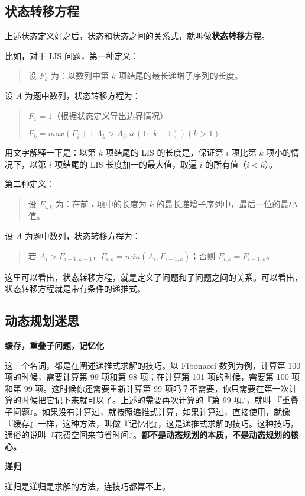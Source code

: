 \subsection{状态转移方程}

上述状态定义好之后，状态和状态之间的关系式，就叫做\textbf{状态转移方程}。

比如，对于 LIS 问题，第一种定义：
\begin{quotation}
设 $F_{k}$ 为：以数列中第 $k$ 项结尾的最长递增子序列的长度。
\end{quotation}
设 $A$ 为题中数列，状态转移方程为：
\begin{quotation}
$F_{1} = 1$（根据状态定义导出边界情况）

$F_{k} = max(F_{i} + 1 | A_{k} > A_{i}, i \epsilon (1\cdots k-1)) (k > 1)$
\end{quotation}
用文字解释一下是：以第 $k$ 项结尾的 LIS 的长度是，保证第 $i$ 项比第 $k$ 项小的情况下，以第 $i$ 项结尾的 LIS 长度加一的最大值，取遍 $i$
的所有值（$i < k$）。

第二种定义：
\begin{quotation}
设 $F_{i, k}$ 为：在前 $i$ 项中的长度为 $k$ 的最长递增子序列中，最后一位的最小值。
\end{quotation}
设 $A$ 为题中数列，状态转移方程为：
\begin{quotation}
若 $A_{i} > F_{i-1, k-1}$，$F_{i, k} = min(A_{i}, F_{i-1, k})$；否则 $F_{i, k} = F_{i-1, k}$。
\end{quotation}
这里可以看出，状态转移方程，就是定义了问题和子问题之间的关系。可以看出，状态转移方程就是带有条件的递推式。

\subsection{动态规划迷思}

\noindent\textbf{缓存，重叠子问题，记忆化}

这三个名词，都是在阐述递推式求解的技巧。以 Fibonacci 数列为例，计算第 100 项的时候，需要计算第 99 项和第 98 项；在计算第 101 项的时候，需要第
100 项和第 99 项。这时候你还需要重新计算第 99 项吗？不需要，你只需要在第一次计算的时候把它记下来就可以了。上述的需要再次计算的『第 99 项』，就叫
『重叠子问题』。如果没有计算过，就按照递推式计算，如果计算过，直接使用，就像『缓存』一样，这种方法，叫做『记忆化』，这是递推式求解的技巧。这种技巧，
通俗的说叫『花费空间来节省时间』。\textbf{都不是动态规划的本质，不是动态规划的核心。}

\noindent\textbf{递归}

递归是递归是求解的方法，连技巧都算不上。


